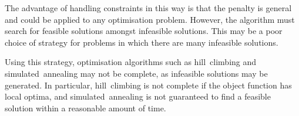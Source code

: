 The advantage of handling constraints in this way is that the penalty is general and could be applied to any optimisation problem.
However, the algorithm must search for feasible solutions amongst infeasible solutions.
This may be a poor choice of strategy for problems in which there are many infeasible solutions.

Using this strategy, optimisation algorithms such as hill~climbing and simulated~annealing may not be complete, as infeasible solutions may be generated.
In particular, hill~climbing is not complete if the object function has local optima, and simulated~annealing is not guaranteed to find a feasible solution within a reasonable amount of time.
